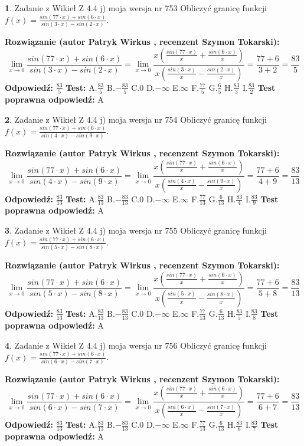 \documentclass[12pt, a4paper]{article}
\theoremstyle{definition} %
\newtheorem{zad}{}
\newcommand{\zadStart}[1]{\begin{zad}#1\newline}
\newcommand{\zadStop}{\end{zad}}
\newcommand{\rozwStart}[2]{\noindent \textbf{Rozwiązanie (autor #1 , recenzent #2): }\newline}
\newcommand{\rozwStop}{\newline}
\newcommand{\odpStart}{\noindent \textbf{Odpowiedź:}\newline}
\newcommand{\odpStop}{\newline}
\newcommand{\testStart}{\noindent \textbf{Test:}\newline}
\newcommand{\testStop}{\newline}
\newcommand{\kluczStart}{\noindent \textbf{Test poprawna odpowiedź:}\newline}
\newcommand{\kluczStop}{\newline}
\begin{document}
\zadStart{Zadanie z Wikieł Z 4.4 j) moja wersja nr 753}
Obliczyć granicę funkcji $f(x)=\frac{sin(77\cdot x) +sin(6\cdot x)}{sin(3\cdot x) -sin(2\cdot x)}$.
\zadStop
\rozwStart{Patryk Wirkus}{Szymon Tokarski}
$$\lim\limits_{x\to 0}\frac{sin(77\cdot x) +sin(6\cdot x)}{sin(3\cdot x) -sin(2\cdot x)}=\lim\limits_{x\to 0}\frac{x(\frac{sin(77\cdot x)}{x}+\frac{sin(6\cdot x)}{x})}{x(\frac{sin(3\cdot x)}{x}-\frac{sin(2\cdot x)}{x})}=\frac{77+6}{3+2} = \frac{83}{5}$$
\rozwStop
\odpStart
$\frac{83}{5}$
\odpStop
\testStart
A.$\frac{83}{5}$
B.$-\frac{83}{5}$
C.$0$
D.$-\infty$
E.$\infty$
F.$\frac{77}{5}$
G.$\frac{6}{5}$
H.$\frac{83}{3}$
I.$\frac{83}{2}$
\testStop
\kluczStart
A
\kluczStop



\zadStart{Zadanie z Wikieł Z 4.4 j) moja wersja nr 754}
Obliczyć granicę funkcji $f(x)=\frac{sin(77\cdot x) +sin(6\cdot x)}{sin(4\cdot x) -sin(9\cdot x)}$.
\zadStop
\rozwStart{Patryk Wirkus}{Szymon Tokarski}
$$\lim\limits_{x\to 0}\frac{sin(77\cdot x) +sin(6\cdot x)}{sin(4\cdot x) -sin(9\cdot x)}=\lim\limits_{x\to 0}\frac{x(\frac{sin(77\cdot x)}{x}+\frac{sin(6\cdot x)}{x})}{x(\frac{sin(4\cdot x)}{x}-\frac{sin(9\cdot x)}{x})}=\frac{77+6}{4+9} = \frac{83}{13}$$
\rozwStop
\odpStart
$\frac{83}{13}$
\odpStop
\testStart
A.$\frac{83}{13}$
B.$-\frac{83}{13}$
C.$0$
D.$-\infty$
E.$\infty$
F.$\frac{77}{13}$
G.$\frac{6}{13}$
H.$\frac{83}{4}$
I.$\frac{83}{9}$
\testStop
\kluczStart
A
\kluczStop



\zadStart{Zadanie z Wikieł Z 4.4 j) moja wersja nr 755}
Obliczyć granicę funkcji $f(x)=\frac{sin(77\cdot x) +sin(6\cdot x)}{sin(5\cdot x) -sin(8\cdot x)}$.
\zadStop
\rozwStart{Patryk Wirkus}{Szymon Tokarski}
$$\lim\limits_{x\to 0}\frac{sin(77\cdot x) +sin(6\cdot x)}{sin(5\cdot x) -sin(8\cdot x)}=\lim\limits_{x\to 0}\frac{x(\frac{sin(77\cdot x)}{x}+\frac{sin(6\cdot x)}{x})}{x(\frac{sin(5\cdot x)}{x}-\frac{sin(8\cdot x)}{x})}=\frac{77+6}{5+8} = \frac{83}{13}$$
\rozwStop
\odpStart
$\frac{83}{13}$
\odpStop
\testStart
A.$\frac{83}{13}$
B.$-\frac{83}{13}$
C.$0$
D.$-\infty$
E.$\infty$
F.$\frac{77}{13}$
G.$\frac{6}{13}$
H.$\frac{83}{5}$
I.$\frac{83}{8}$
\testStop
\kluczStart
A
\kluczStop



\zadStart{Zadanie z Wikieł Z 4.4 j) moja wersja nr 756}
Obliczyć granicę funkcji $f(x)=\frac{sin(77\cdot x) +sin(6\cdot x)}{sin(6\cdot x) -sin(7\cdot x)}$.
\zadStop
\rozwStart{Patryk Wirkus}{Szymon Tokarski}
$$\lim\limits_{x\to 0}\frac{sin(77\cdot x) +sin(6\cdot x)}{sin(6\cdot x) -sin(7\cdot x)}=\lim\limits_{x\to 0}\frac{x(\frac{sin(77\cdot x)}{x}+\frac{sin(6\cdot x)}{x})}{x(\frac{sin(6\cdot x)}{x}-\frac{sin(7\cdot x)}{x})}=\frac{77+6}{6+7} = \frac{83}{13}$$
\rozwStop
\odpStart
$\frac{83}{13}$
\odpStop
\testStart
A.$\frac{83}{13}$
B.$-\frac{83}{13}$
C.$0$
D.$-\infty$
E.$\infty$
F.$\frac{77}{13}$
G.$\frac{6}{13}$
H.$\frac{83}{6}$
I.$\frac{83}{7}$
\testStop
\kluczStart
A
\kluczStop
\end{document}
